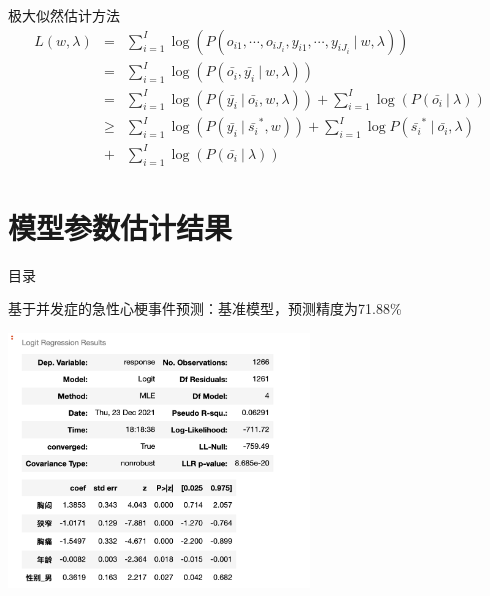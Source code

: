 \documentclass{beamer}
\newcommand{\nb}{\nonumber}
\begin{document}
\begin{frame}{极大似然估计方法}
\begin{eqnarray}
    L(w,\lambda)&=&\sum\limits_{i=1}^{I} \log(P(o_{i1},\cdots,o_{iJ_{i}},y_{i1},\cdots,y_{iJ_{i}}~|~w,\lambda))\nb\\
    &=&\sum\limits_{i=1}^{I} \log(P(\bar{o_{i}},\bar{y_{i}}~|~w,\lambda))\nb\\
    &=&\sum\limits_{i=1}^{I} \log(P(\bar{y_{i}}~|~\bar{o_{i}},w,\lambda))
    + \sum\limits_{i=1}^{I}\log(P(\bar{o_{i}}~|~\lambda))\nb\\
    &\geq &\sum\limits_{i=1}^{I}\log(P(\bar{y_{i}}~|~\bar{s_i}^*,w))+\sum\limits_{i=1}^{I}\log P(\bar{s_i}^*~|~\bar{o_{i}},\lambda) \nb\\
    &+& \sum\limits_{i=1}^{I}\log(P(\bar{o_{i}}~|~\lambda)) \nb
\end{eqnarray}
\end{frame}

\section{模型参数估计结果}
\begin{frame}{目录}
\tableofcontents[sectionstyle=show/shaded,subsectionstyle=show/shaded/hide]
\end{frame}

\begin{frame}{基于并发症的急性心梗事件预测：基准模型，预测精度为71.88\%}
\begin{center}
\includegraphics[width=0.6\textwidth]{LR_benchmark.png}\\
\end{center}
\end{frame}
\end{document}
